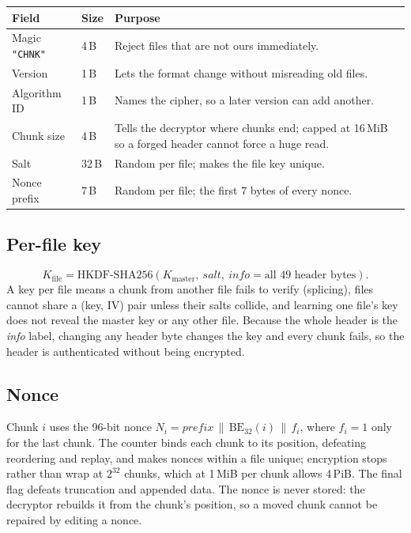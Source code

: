 \documentclass[11pt,a4paper]{article}
\newcommand{\cat}{\,\|\,}
\begin{document}
\begin{center}
\begin{tabularx}{\textwidth}{llX}
\toprule
Field & Size & Purpose\\
\midrule
Magic \texttt{"CHNK"} & 4\,B & Reject files that are not ours immediately.\\
Version & 1\,B & Lets the format change without misreading old files.\\
Algorithm ID & 1\,B & Names the cipher, so a later version can add another.\\
Chunk size & 4\,B & Tells the decryptor where chunks end; capped at 16\,MiB so a forged header cannot force a huge read.\\
Salt & 32\,B & Random per file; makes the file key unique.\\
Nonce prefix & 7\,B & Random per file; the first 7 bytes of every nonce.\\
\bottomrule
\end{tabularx}
\end{center}

\subsection{Per-file key}
\[
K_{\mathrm{file}} = \mathrm{HKDF\text{-}SHA256}(K_{\mathrm{master}},\ \mathit{salt},\ \mathit{info} = \text{all 49 header bytes}).
\]
A key per file means a chunk from another file fails to verify (splicing), files cannot share a (key, IV) pair unless their salts collide, and learning one file's key does not reveal the master key or any other file. Because the whole header is the \emph{info} label, changing any header byte changes the key and every chunk fails, so the header is authenticated without being encrypted.

\subsection{Nonce}
Chunk $i$ uses the 96-bit nonce $N_i = \mathit{prefix} \cat \mathrm{BE}_{32}(i) \cat f_i$, where $f_i = 1$ only for the last chunk. The counter binds each chunk to its position, defeating reordering and replay, and makes nonces within a file unique; encryption stops rather than wrap at $2^{32}$ chunks, which at 1\,MiB per chunk allows 4\,PiB. The final flag defeats truncation and appended data. The nonce is never stored: the decryptor rebuilds it from the chunk's position, so a moved chunk cannot be repaired by editing a nonce.
\end{document}

